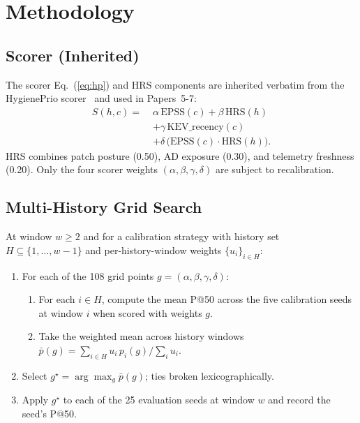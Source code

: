 \section{Methodology}

\subsection{Scorer (Inherited)}

The scorer Eq.~(\ref{eq:hp}) and HRS components are
inherited verbatim from the HygienePrio scorer~\cite{paper4hygieneprio} and used in
Papers~5-7:
\begin{equation}
\begin{aligned}
S(h,c) =\;& \alpha\,\mathrm{EPSS}(c) + \beta\,\mathrm{HRS}(h) \\
 & + \gamma\,\mathrm{KEV\_recency}(c) \\
 & + \delta\,\bigl(\mathrm{EPSS}(c) \cdot \mathrm{HRS}(h)\bigr).
\end{aligned}
\label{eq:hp}
\end{equation}
HRS combines patch posture (0.50), AD exposure (0.30), and telemetry
freshness (0.20). Only the four scorer weights $(\alpha, \beta, \gamma,
\delta)$ are subject to recalibration.

\subsection{Multi-History Grid Search}

At window $w \geq 2$ and for a calibration strategy with history set
$H \subseteq \{1, \ldots, w-1\}$ and per-history-window weights
$\{u_i\}_{i \in H}$:
\begin{enumerate}
\item For each of the 108 grid points $g = (\alpha, \beta, \gamma,
\delta)$:
\begin{enumerate}
\item For each $i \in H$, compute the mean P@50 across the five
calibration seeds at window $i$ when scored with weights $g$.
\item Take the weighted mean across history windows
$\bar{p}(g) = \sum_{i \in H} u_i\, p_i(g) / \sum_i u_i$.
\end{enumerate}
\item Select $g^\star = \arg\max_g \bar{p}(g)$; ties broken lexicographically.
\item Apply $g^\star$ to each of the 25 evaluation seeds at window $w$
and record the seed's P@50.
\end{enumerate}

